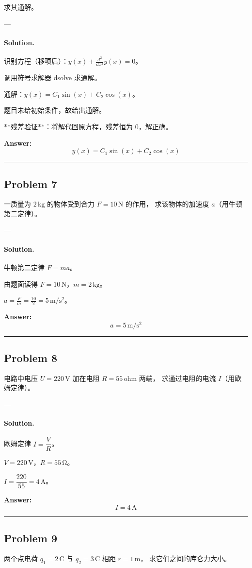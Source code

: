 \documentclass[12pt, a4paper]{article}
\newcommand{\problem}[1]{\subsection*{Problem #1}}
\newcommand{\solution}{\paragraph{Solution.}}
\begin{document}
求其通解。

---

\solution

识别方程（移项后）：$y{\left(x \right)} + \frac{d^{2}}{d x^{2}} y{\left(x \right)} = 0$。

调用符号求解器 dsolve 求通解。

通解：$y{\left(x \right)} = C_{1} \sin{\left(x \right)} + C_{2} \cos{\left(x \right)}$。

题目未给初始条件，故给出通解。

**残差验证**：将解代回原方程，残差恒为 0，解正确。

\textbf{Answer:}
\[\boxed{y{\left(x \right)} = C_{1} \sin{\left(x \right)} + C_{2} \cos{\left(x \right)}}\]

\vspace{1em}
\hrule
\vspace{1em}

\problem{7}

一质量为 $2\,\mathrm{kg}$ 的物体受到合力 $F = 10\,\mathrm{N}$ 的作用，
求该物体的加速度 $a$（用牛顿第二定律）。

---

\solution

牛顿第二定律 $F = ma$。

由题面读得 $F = 10\,\mathrm{N}$，$m = 2\,\mathrm{kg}$。

$a = \frac{F}{m} = \frac{10}{2} = 5\,\mathrm{m/s^2}$。

\textbf{Answer:}
\[\boxed{a = 5\,\mathrm{m/s^2}}\]

\vspace{1em}
\hrule
\vspace{1em}

\problem{8}

电路中电压 $U = 220\,\mathrm{V}$ 加在电阻 $R = 55\,\mathrm{ohm}$ 两端，
求通过电阻的电流 $I$（用欧姆定律）。

---

\solution

欧姆定律 $I = \dfrac{V}{R}$。

$V = 220\,\mathrm{V}$，$R = 55\,\mathrm{\Omega}$。

$I = \dfrac{220}{55} = 4\,\mathrm{A}$。

\textbf{Answer:}
\[\boxed{I = 4\,\mathrm{A}}\]

\vspace{1em}
\hrule
\vspace{1em}

\problem{9}

两个点电荷 $q_1 = 2\,\mathrm{C}$ 与 $q_2 = 3\,\mathrm{C}$ 相距 $r = 1\,\mathrm{m}$，
求它们之间的库仑力大小。
\end{document}
